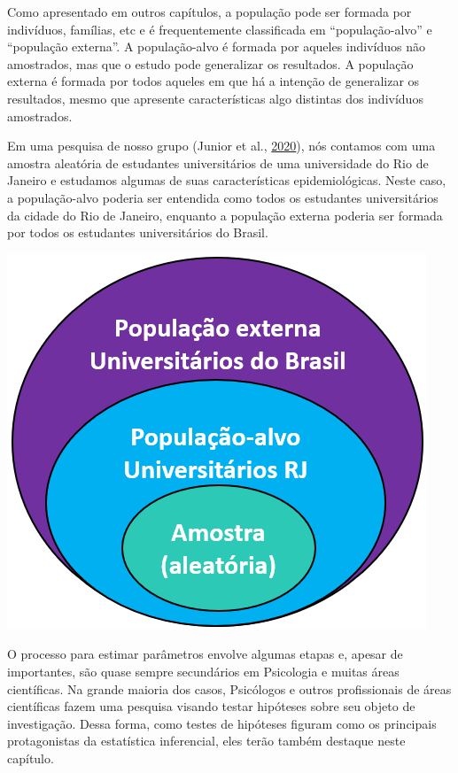 \documentclass[
]{book}
\begin{document}
Como apresentado em outros capítulos, a população pode ser formada por
indivíduos, famílias, etc e é frequentemente classificada em
``população-alvo'' e ``população externa''. A população-alvo é formada
por aqueles indivíduos não amostrados, mas que o estudo pode generalizar
os resultados. A população externa é formada por todos aqueles em que há
a intenção de generalizar os resultados, mesmo que apresente
características algo distintas dos indivíduos amostrados.

Em uma pesquisa de nosso grupo (Junior et al.,
\protect\hyperlink{ref-AfonsoJunior2020}{2020}), nós contamos com uma
amostra aleatória de estudantes universitários de uma universidade do
Rio de Janeiro e estudamos algumas de suas características
epidemiológicas. Neste caso, a população-alvo poderia ser entendida como
todos os estudantes universitários da cidade do Rio de Janeiro, enquanto
a população externa poderia ser formada por todos os estudantes
universitários do Brasil.

\includegraphics{./img/cap_inferencia_amostra_populacao.png}

O processo para estimar parâmetros envolve algumas etapas e, apesar de
importantes, são quase sempre secundários em Psicologia e muitas áreas
científicas. Na grande maioria dos casos, Psicólogos e outros
profissionais de áreas científicas fazem uma pesquisa visando testar
hipóteses sobre seu objeto de investigação. Dessa forma, como testes de
hipóteses figuram como os principais protagonistas da estatística
inferencial, eles terão também destaque neste capítulo.
\end{document}

